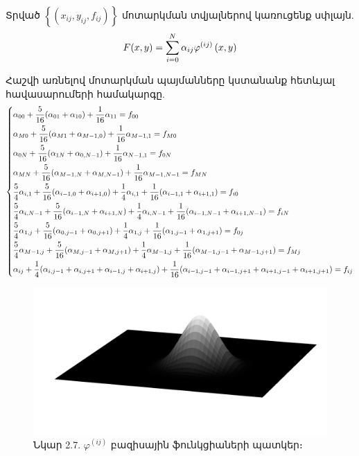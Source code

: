 \documentclass[fleqn, bachelor,subf,12pt,notitlepage]{article}
\begin{document}
Տրված $\left\{\left(x_{ij}, y_{ij}, f_{ij}\right)\right\}$ մոտարկման տվյալներով կառուցենք սփլայն.
\begin{equation}
F(x,y) = \sum_{i=0}^{N} \alpha_{ij}\varphi^{(ij)}\left(x, y\right)$$
\end{equation}

Հաշվի առնելով մոտարկման պայմանները կստանանք հետևյալ հավասարումերի համակարգը.
\begin{equation}
\begin{dcases}
\alpha_{00}+\frac{5}{16}(\alpha_{01} + \alpha_{10}) +\frac{1}{16}\alpha_{11} = f_{00}\\
\alpha_{M0}+\frac{5}{16}(\alpha_{M1} + \alpha_{M-1,0}) +\frac{1}{16}\alpha_{M-1, 1} = f_{M0}\\
\alpha_{0N}+\frac{5}{16}(\alpha_{1N} + \alpha_{0,N-1}) +\frac{1}{16}\alpha_{N-1, 1} = f_{0N}\\
\alpha_{MN}+\frac{5}{16}(\alpha_{M-1,N} + \alpha_{M,N-1}) +\frac{1}{16}\alpha_{M-1,N-1} = f_{MN}\\
\frac{5}{4}\alpha_{i,1}+\frac{5}{16}(\alpha_{i-1,0} + \alpha_{i+1,0}) +\frac{1}{4}\alpha_{i,1} + \frac{1}{16}(\alpha_{i-1,1}+\alpha_{i+1,1}) = f_{i0}\\
\frac{5}{4}\alpha_{i,N-1}+\frac{5}{16}(\alpha_{i-1,N} + \alpha_{i+1,N}) +\frac{1}{4}\alpha_{i,N-1} + \frac{1}{16}(\alpha_{i-1,N-1}+\alpha_{i+1,N-1}) = f_{iN}\\
\frac{5}{4}\alpha_{1,j}+\frac{5}{16}(\alpha_{0,j-1} + \alpha_{0,j+1}) +\frac{1}{4}\alpha_{1,j} + \frac{1}{16}(\alpha_{1,j-1}+\alpha_{1,j+1}) = f_{0j}\\
\frac{5}{4}\alpha_{M-1,j}+\frac{5}{16}(\alpha_{M,j-1} + \alpha_{M,j+1}) +\frac{1}{4}\alpha_{M-1,j} + \frac{1}{16}(\alpha_{M-1,j-1}+\alpha_{M-1,j+1}) = f_{Mj}\\
\alpha_{ij} + \frac{1}{4}(\alpha_{i,j-1} + \alpha_{i,j+1} + \alpha_{i-1,j} + \alpha_{i+1,j}) + \frac{1}{16}(\alpha_{i-1,j-1} + \alpha_{i-1,j+1} + \alpha_{i+1,j-1} +\alpha_{i+1,j+1}) = f_{ij}
\end{dcases}
\end{equation}
\newpage
\begin{figure}[h!]
\centering
\includegraphics[width=1.0\textwidth]{images/two_dimensional_basis}
\captionsetup{labelformat=empty}
\caption{Նկար 2.7. $\varphi^{(ij)}$ բազիսային ֆունկցիաների պատկեր։}
\end{figure}
\end{document}
